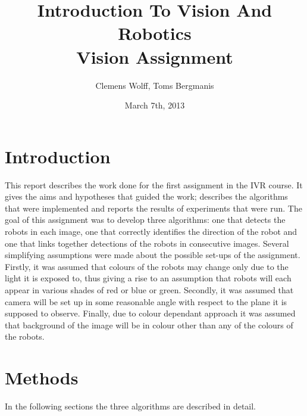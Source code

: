 \documentclass[10pt,a4paper,twocolumn]{article}
\title{Introduction To Vision And Robotics \\ Vision Assignment}
\author{Clemens Wolff, Toms Bergmanis}
\date{March 7th, 2013}
\begin{document}
\maketitle

\section{Introduction}
This report describes the work done for the first assignment in the IVR course. 
It gives the aims and hypotheses that guided the work; describes the algorithms 
that were implemented and reports the results of experiments that were run.
The goal of this assignment was to develop three algorithms: one that detects 
the robots in each image, one that correctly identifies the direction of the 
robot and one that links together detections of the robots in consecutive 
images. 
Several simplifying assumptions were made about the possible set-ups of the 
assignment.  Firstly, it was assumed that colours of the robots may change only 
due to the light it is exposed to, thus giving a rise to an assumption that 
robots will each appear in various shades of red or blue or green. Secondly, it 
was assumed that camera will be set up in some reasonable angle with respect to 
the plane it is supposed to observe. Finally, due to colour dependant approach 
it was assumed that background of the image will be in colour other than any of 
the colours of the robots.


\section{Methods}
In the following sections the three algorithms are described in detail. 
\end{document}
